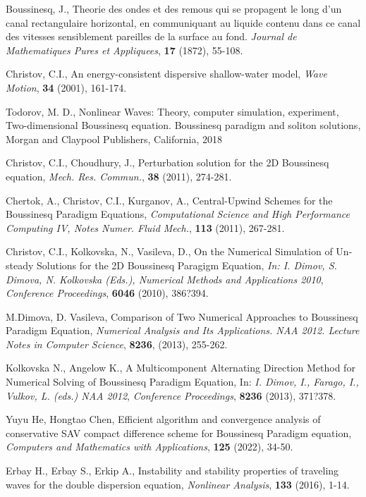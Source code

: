 \documentclass[a5paper]{article}
\theoremstyle{remark}
\begin{document}
\begin{large}
\begin{thebibliography}{99}
	 Boussinesq, J., Theorie des ondes et des remous qui se propagent le long d'un canal rectangulaire horizontal, en communiquant au liquide contenu dans ce canal des vitesses sensiblement pareilles de la surface au fond.  {\it Journal de Mathematiques Pures et Appliquees}, \textbf{17} (1872), 55-108.

	 Christov, C.I., An energy-consistent dispersive shallow-water model,  {\it Wave Motion}, \textbf{34} (2001), 161-174.

	 Todorov, M. D., Nonlinear Waves: Theory, computer simulation, experiment, Two-dimensional Boussinesq equation. Boussinesq paradigm and soliton solutions, Morgan and Claypool Publishers, California, 2018

	 Christov, C.I., Choudhury, J., Perturbation solution for the 2D Boussinesq equation, {\it Mech. Res. Commun.}, \textbf{38} (2011), 274-281.

	 Chertok, A., Christov, C.I., Kurganov, A., Central-Upwind Schemes for the Boussinesq Paradigm Equations,
{\it Computational Science and High Performance Computing IV, Notes Numer. Fluid Mech.}, \textbf{113} (2011), 267-281.

	 Christov, C.I., Kolkovska, N., Vasileva, D., On the Numerical Simulation of Un-steady Solutions for the 2D Boussinesq Paragigm Equation,
{\it In: I. Dimov, S. Dimova, N. Kolkovska (Eds.), Numerical Methods and Applications 2010},
\emph{Conference Proceedings}, \textbf{6046} (2010), 386?394.

	 M.Dimova, D. Vasileva, Comparison of Two Numerical Approaches to Boussinesq Paradigm Equation, 
{\it Numerical Analysis and Its Applications. NAA 2012. Lecture Notes in Computer Science}, \textbf{8236}, (2013), 255-262.

	 Kolkovska N., Angelow K., A Multicomponent Alternating Direction Method for Numerical Solving of Boussinesq Paradigm Equation,
In: {\it  I. Dimov, I., Farago, I., Vulkov, L. (eds.) NAA 2012},
\emph{Conference Proceedings}, \textbf{8236} (2013), 371?378.

	 Yuyu He, Hongtao Chen, Efficient algorithm and convergence analysis of conservative SAV compact difference scheme for Boussinesq Paradigm equation, 
{\it Computers and Mathematics with Applications}, \textbf{125} (2022), 34-50.

	 Erbay H., Erbay S., Erkip A., Instability and stability properties of traveling waves for the double dispersion equation, {\it Nonlinear Analysis}, \textbf{133} (2016), 1-14.


\end{thebibliography}
\end{large}
\end{document}

